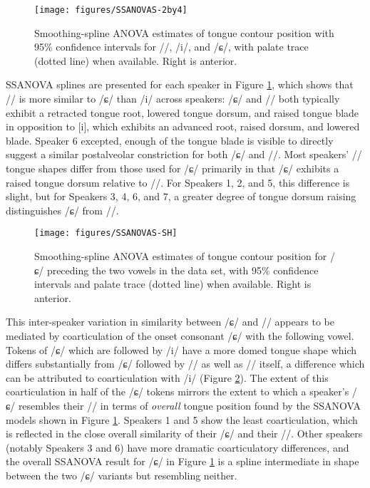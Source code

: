 \documentclass[output=paper,hidelinks]{langscibook}
\begin{document}
\begin{figure}[p]
\caption{Smoothing-spline ANOVA estimates of tongue contour position with 95\% confidence intervals for /\iz{}/, /i/, and /ɕ/, with palate trace (dotted line) when available. Right is anterior.}
\label{fig:2:ssanova}
	\texttt{[image: figures/SSANOVAS-2by4]}
\end{figure}

SSANOVA splines are presented for each speaker in Figure \ref{fig:2:ssanova}, which shows that /\iz{}/ is more similar to /ɕ/ than /i/ across speakers: /ɕ/ and /\iz{}/ both typically exhibit a retracted tongue root, lowered tongue dorsum, and raised tongue blade in opposition to [i], which exhibits an advanced root, raised dorsum, and lowered blade.
%
Speaker 6 excepted, enough of the tongue blade is visible to directly suggest a similar postalveolar constriction for both /ɕ/ and /\iz{}/.
%
Most speakers' /\iz{}/ tongue shapes differ from those used for /ɕ/ primarily in that /ɕ/ exhibits a raised tongue dorsum relative to /\iz{}/.
%
For Speakers 1, 2, and 5, this difference is slight, but for Speakers 3, 4, 6, and 7, a greater degree of tongue dorsum raising distinguishes /ɕ/ from /\iz{}/.

\begin{figure}[t]
\caption{Smoothing-spline ANOVA estimates of tongue contour position for /ɕ/ preceding the two vowels in the data set, with 95\% confidence intervals and palate trace (dotted line) when available. Right is anterior.}
\label{fig:3:ssanova}
	\texttt{[image: figures/SSANOVAS-SH]}
\end{figure}

This inter-speaker variation in similarity between /ɕ/ and /\iz{}/ appears to be mediated by coarticulation of the onset consonant /ɕ/ with the following vowel.
%
Tokens of /ɕ/ which are followed by /i/ have a more domed tongue shape which differs substantially from /ɕ/ followed by /\iz{}/ as well as /\iz{}/ itself, a difference which can be attributed to coarticulation with /i/ (Figure \ref{fig:3:ssanova}).
%
The extent of this coarticulation in half of the /ɕ/ tokens mirrors the extent to which a speaker's /ɕ/ resembles their /\iz{}/ in terms of \textit{overall} tongue position found by the SSANOVA models shown in Figure \ref{fig:2:ssanova}.
%
Speakers 1 and 5 show the least coarticulation, which is reflected in the close overall similarity of their /ɕ/ and their /\iz{}/. Other speakers (notably Speakers 3 and 6) have more dramatic coarticulatory differences, and the overall SSANOVA result for /ɕ/ in Figure \ref{fig:2:ssanova} is a spline intermediate in shape between the two /ɕ/ variants but resembling neither.
%
\end{document}

